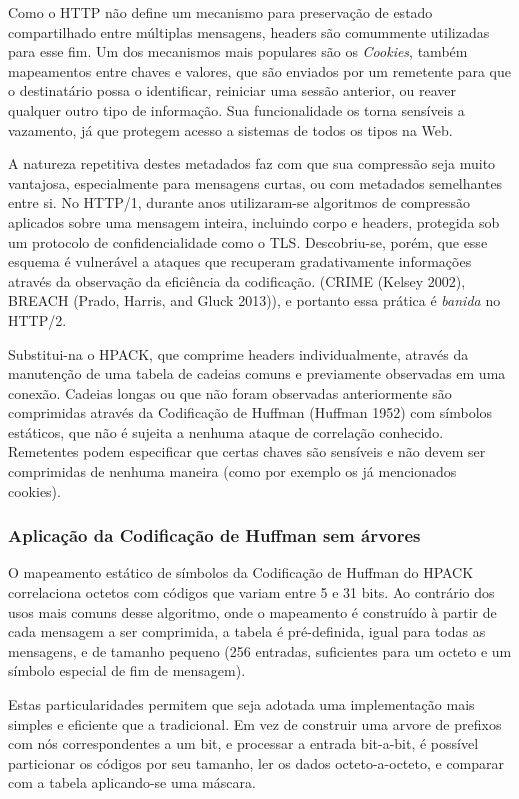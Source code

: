 \documentclass[12pt,a4paper,openright,twoside,english,brazil,]{abntex2}	%
\begin{document}
Como o HTTP não define um mecanismo para preservação de estado
compartilhado entre múltiplas mensagens, headers são comummente
utilizadas para esse fim. Um dos mecanismos mais populares são os
\emph{Cookies}, também mapeamentos entre chaves e valores, que são
enviados por um remetente para que o destinatário possa o identificar,
reiniciar uma sessão anterior, ou reaver qualquer outro tipo de
informação. Sua funcionalidade os torna sensíveis a vazamento, já que
protegem acesso a sistemas de todos os tipos na Web.

A natureza repetitiva destes metadados faz com que sua compressão seja
muito vantajosa, especialmente para mensagens curtas, ou com metadados
semelhantes entre si. No HTTP/1, durante anos utilizaram-se algoritmos
de compressão aplicados sobre uma mensagem inteira, incluindo corpo e
headers, protegida sob um protocolo de confidencialidade como o TLS.
Descobriu-se, porém, que esse esquema é vulnerável a ataques que
recuperam gradativamente informações através da observação da eficiência
da codificação. (CRIME (Kelsey 2002), BREACH (Prado, Harris, and Gluck
2013)), e portanto essa prática é \emph{banida} no HTTP/2.

Substitui-na o HPACK, que comprime headers individualmente, através da
manutenção de uma tabela de cadeias comuns e previamente observadas em
uma conexão. Cadeias longas ou que não foram observadas anteriormente
são comprimidas através da Codificação de Huffman (Huffman 1952) com
símbolos estáticos, que não é sujeita a nenhuma ataque de correlação
conhecido. Remetentes podem especificar que certas chaves são sensíveis
e não devem ser comprimidas de nenhuma maneira (como por exemplo os já
mencionados cookies).

\subsubsection{Aplicação da Codificação de Huffman sem
árvores}\label{aplicauxe7uxe3o-da-codificauxe7uxe3o-de-huffman-sem-uxe1rvores}

O mapeamento estático de símbolos da Codificação de Huffman do HPACK
correlaciona octetos com códigos que variam entre 5 e 31 bits. Ao
contrário dos usos mais comuns desse algoritmo, onde o mapeamento é
construído à partir de cada mensagem a ser comprimida, a tabela é
pré-definida, igual para todas as mensagens, e de tamanho pequeno (256
entradas, suficientes para um octeto e um símbolo especial de fim de
mensagem).

Estas particularidades permitem que seja adotada uma implementação mais
simples e eficiente que a tradicional. Em vez de construir uma arvore de
prefixos com nós correspondentes a um bit, e processar a entrada
bit-a-bit, é possível particionar os códigos por seu tamanho, ler os
dados octeto-a-octeto, e comparar com a tabela aplicando-se uma máscara.
\end{document}

